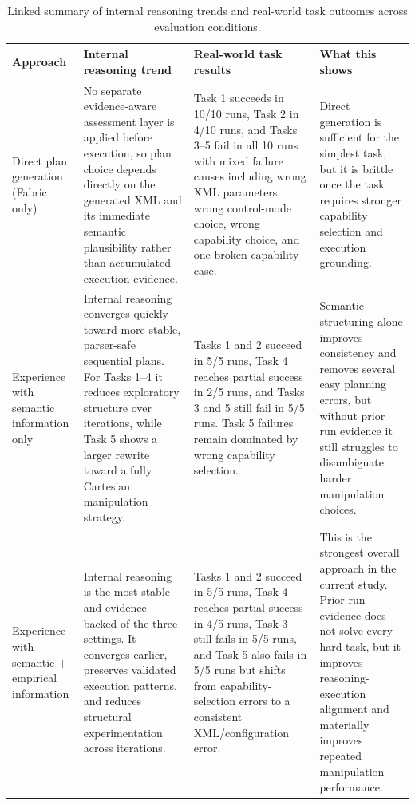 \documentclass[letterpaper, 10pt, conference]{ieeeconf}
\begin{document}
\begin{table}[tb]
    \centering
    \caption{Linked summary of internal reasoning trends and real-world task outcomes across evaluation conditions.}
    \label{tab:evaluation_results}
    \footnotesize
    \setlength{\tabcolsep}{4pt}
    \begin{tabular}{@{}>{\raggedright\arraybackslash}p{} >{\raggedright\arraybackslash}p{} >{\raggedright\arraybackslash}p{} >{\raggedright\arraybackslash}p{}@{}}
        \toprule
        Approach & Internal reasoning trend & Real-world task results & What this shows \\
        \midrule
        Direct plan generation (Fabric only) & No separate evidence-aware assessment layer is applied before execution, so plan choice depends directly on the generated XML and its immediate semantic plausibility rather than accumulated execution evidence. & Task 1 succeeds in 10/10 runs, Task 2 in 4/10 runs, and Tasks 3--5 fail in all 10 runs with mixed failure causes including wrong XML parameters, wrong control-mode choice, wrong capability choice, and one broken capability case. & Direct generation is sufficient for the simplest task, but it is brittle once the task requires stronger capability selection and execution grounding. \\
        \midrule
        Experience with semantic information only & Internal reasoning converges quickly toward more stable, parser-safe sequential plans. For Tasks 1--4 it reduces exploratory structure over iterations, while Task 5 shows a larger rewrite toward a fully Cartesian manipulation strategy. & Tasks 1 and 2 succeed in 5/5 runs, Task 4 reaches partial success in 2/5 runs, and Tasks 3 and 5 still fail in 5/5 runs. Task 5 failures remain dominated by wrong capability selection. & Semantic structuring alone improves consistency and removes several easy planning errors, but without prior run evidence it still struggles to disambiguate harder manipulation choices. \\
        \midrule
        Experience with semantic + empirical information & Internal reasoning is the most stable and evidence-backed of the three settings. It converges earlier, preserves validated execution patterns, and reduces structural experimentation across iterations. & Tasks 1 and 2 succeed in 5/5 runs, Task 4 reaches partial success in 4/5 runs, Task 3 still fails in 5/5 runs, and Task 5 also fails in 5/5 runs but shifts from capability-selection errors to a consistent XML/configuration error. & This is the strongest overall approach in the current study. Prior run evidence does not solve every hard task, but it improves reasoning-execution alignment and materially improves repeated manipulation performance. \\
        \bottomrule
    \end{tabular}
\end{table}
\end{document}
